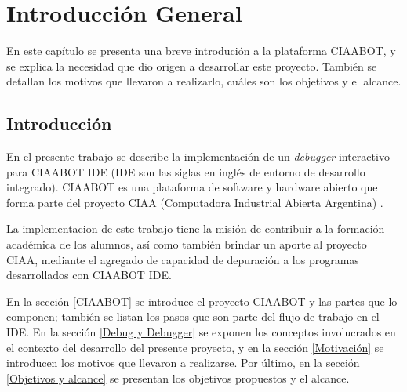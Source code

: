 
\chapter{Introducción General} %

\label{Chapter1} %
\label{IntroGeneral}
En este capítulo se presenta una breve introdución a la plataforma CIAABOT, y se
explica la necesidad que dio origen a desarrollar este proyecto. También se detallan
los motivos que llevaron a realizarlo, cuáles son los objetivos y el alcance.


\newcommand{\keyword}[1]{\textbf{#1}}
\newcommand{\tabhead}[1]{\textbf{#1}}
\newcommand{\code}[1]{\texttt{#1}}
\newcommand{\file}[1]{\texttt{\bfseries#1}}
\newcommand{\option}[1]{\texttt{\itshape#1}}
\newcommand{\grados}{$^{\circ}$}



\section{Introducción}
\label{Introducción}
En el presente trabajo se describe la implementación de un \emph{debugger} interactivo
para CIAABOT IDE (IDE son las siglas en inglés de entorno de desarrollo integrado). CIAABOT es una plataforma de software y hardware abierto que forma parte del proyecto CIAA (Computadora Industrial Abierta Argentina) \citep{CIAA}. 


La implementacion de este trabajo tiene la misión de contribuir a la formación
académica de los alumnos, así como también brindar un aporte al proyecto CIAA, mediante el agregado de capacidad de depuración a los programas desarrollados con CIAABOT IDE.

En la sección \ref{CIAABOT} se introduce el proyecto CIAABOT y las partes que lo componen; también se listan los pasos que son parte del flujo de trabajo en el IDE.
En la sección \ref{Debug y Debugger} se exponen los conceptos involucrados en el contexto del desarrollo del presente proyecto, y en la sección \ref{Motivación} se introducen los motivos que llevaron a realizarse. Por último, en la sección \ref{Objetivos y alcance} se presentan los objetivos propuestos y el alcance.


